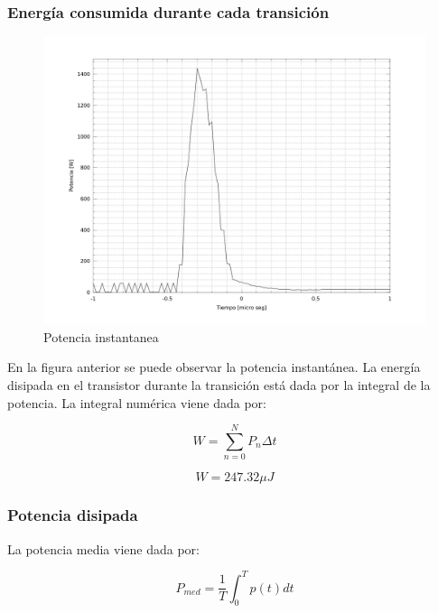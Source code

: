 \documentclass[a4paper,10pt]{article}
\begin{document}
\subsubsection*{Energía consumida durante cada transición}

\begin{figure}[H] %
\begin{center}
\includegraphics[scale=0.2]{./imagenes/Potencia1.png}
\caption{Potencia instantanea}
 \label{fig:Potencia1}
\end{center}
\end{figure}

En la figura anterior se puede observar la potencia instantánea. La energía disipada en el transistor durante la transición está dada por la integral de la potencia. La integral numérica viene dada por:

\begin{equation}
W = \sum_{n=0}^N P_n \Delta t
\end{equation}

\begin{equation}
	W = 247.32  \unit{\mu J}
\end{equation}
\subsubsection*{Potencia disipada}

La potencia media viene dada por:

\begin{equation}
P_{med} = \frac{1}{T} \int_0^T p(t) dt
\end{equation}
\end{document}
